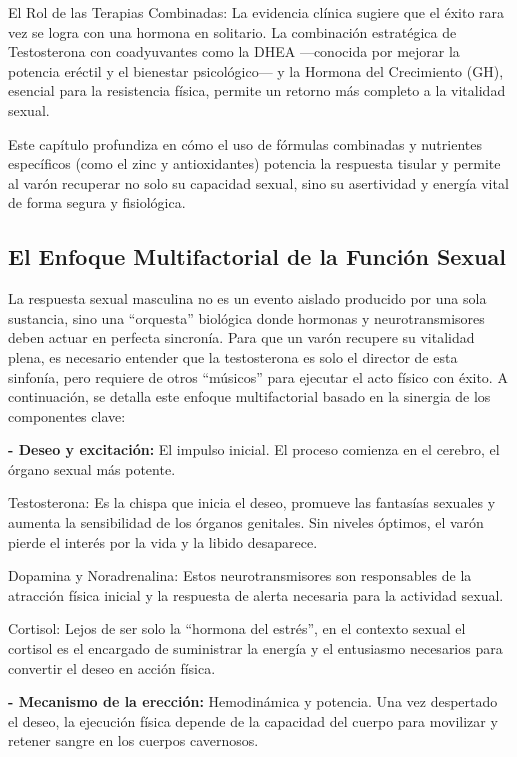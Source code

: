 \documentclass[
  spanish,
]{article}
\begin{document}
El Rol de las Terapias Combinadas: La evidencia clínica sugiere que el éxito rara vez se logra con una hormona en solitario. La combinación estratégica de Testosterona con coadyuvantes como la DHEA ---conocida por mejorar la potencia eréctil y el bienestar psicológico--- y la Hormona del Crecimiento (GH), esencial para la resistencia física, permite un retorno más completo a la vitalidad sexual.

Este capítulo profundiza en cómo el uso de fórmulas combinadas y nutrientes específicos (como el zinc y antioxidantes) potencia la respuesta tisular y permite al varón recuperar no solo su capacidad sexual, sino su asertividad y energía vital de forma segura y fisiológica.

\subsection{El Enfoque Multifactorial de la Función Sexual}\label{el-enfoque-multifactorial-de-la-funciuxf3n-sexual}

La respuesta sexual masculina no es un evento aislado producido por una sola sustancia, sino una ``orquesta'' biológica donde hormonas y neurotransmisores deben actuar en perfecta sincronía.
Para que un varón recupere su vitalidad plena, es necesario entender que la testosterona es solo el director de esta sinfonía, pero requiere de otros ``músicos'' para ejecutar el acto físico con éxito.
A continuación, se detalla este enfoque multifactorial basado en la sinergia de los componentes clave:

\textbf{- Deseo y excitación:} El impulso inicial.
El proceso comienza en el cerebro, el órgano sexual más potente.

Testosterona: Es la chispa que inicia el deseo, promueve las fantasías sexuales y aumenta la sensibilidad de los órganos genitales. Sin niveles óptimos, el varón pierde el interés por la vida y la libido desaparece.

Dopamina y Noradrenalina: Estos neurotransmisores son responsables de la atracción física inicial y la respuesta de alerta necesaria para la actividad sexual.

Cortisol: Lejos de ser solo la ``hormona del estrés'', en el contexto sexual el cortisol es el encargado de suministrar la energía y el entusiasmo necesarios para convertir el deseo en acción física.

\textbf{- Mecanismo de la erección:} Hemodinámica y potencia.
Una vez despertado el deseo, la ejecución física depende de la capacidad del cuerpo para movilizar y retener sangre en los cuerpos cavernosos.
\end{document}
